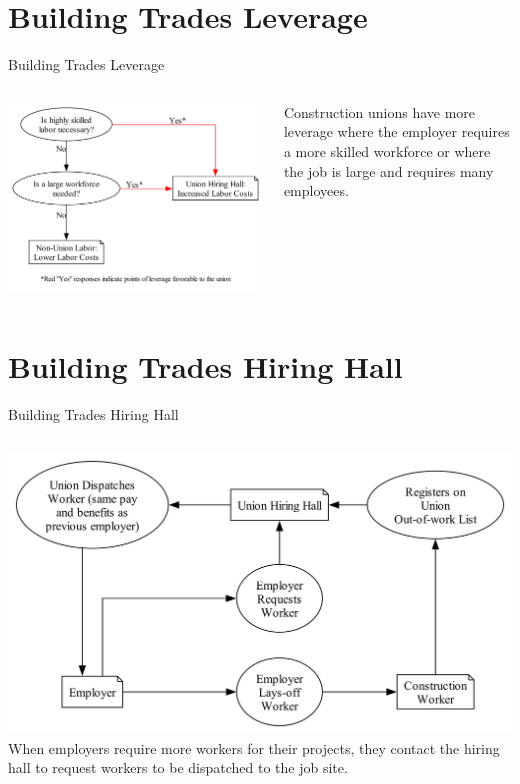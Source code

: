 \documentclass{beamer}
\begin{document}
\section{Building Trades Leverage}
\begin{frame}{Building Trades Leverage}
  \begin{columns}
    \includegraphics[width=\linewidth]{../images/union_power_red}

    Construction unions have more leverage where the employer requires a more skilled workforce or where the job is large and requires many employees.
  \end{columns}
\end{frame}

\section{Building Trades Hiring Hall}
\begin{frame}{Building Trades Hiring Hall}
	\begin{columns}
	\includegraphics[width=\linewidth]{../images/hiring_hall}
	When employers require more workers for their projects, they contact the hiring hall to request workers to be dispatched to the job site.
	\end{columns}
\end{frame}
\end{document}
